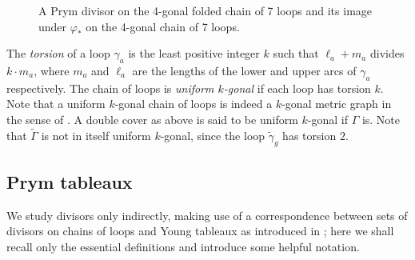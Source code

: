 \documentclass[11pt,reqno]{amsart}
\newcommand*{\N}{\mathbb{N}}
\newcommand*{\maps}{\nobreak\mskip2mu\mathpunct{}\nonscript
  \mkern-\thinmuskip{:}\mskip6muplus1mu\relax}
\newcommand*{\ti}[1]{\tilde{#1}}
\newcommand*{\wti}[1]{\widetilde{#1}}
\newcommand{\caelan}[1]{\textcolor{orange}{\sf C: [#1]}}
\newcommand{\steven}[1]{\textcolor{pink}{\sf S: [#1]}}
\theoremstyle{definition}
\theoremstyle{problem}
\theoremstyle{plain}
\theoremstyle{remark}
\theoremstyle{theorem}
\numberwithin{equation}{section}
\numberwithin{figure}{section}
\begin{document}
\begin{figure}[htb]
  \centering
  
  \caption{A Prym divisor on the 4-gonal folded chain of 7 loops and
    its image under $\varphi_{*}$ on the 4-gonal chain of 7 loops.}
  \label{fig:2}
\end{figure}

The \textit{torsion} of a loop $\gamma_a$ is the least positive
integer $k$ such that $\ell_a+m_a$ divides $k\cdot m_a$, where $m_a$
and $\ell_a$ are the lengths of the lower and upper arcs of $\gamma_a$
respectively.  The chain of loops is \emph{uniform $k$-gonal} if each
loop has torsion $k$. Note that a uniform $k$-gonal chain of loops is
indeed a $k$-gonal metric graph in the sense of \cite[Section
1.3.2]{ABBR152}.  A double cover as above is said to be uniform
$k$-gonal if $\Gamma$ is.  Note that $\wti\Gamma$ is not in itself
uniform $k$-gonal, since the loop $\ti\gamma_g$ has torsion
$2$. %

\subsection{Prym tableaux}
We study divisors only indirectly, making use of a correspondence
between sets of divisors on chains of loops and Young tableaux as
introduced in \cite{Pflueger, len2019skeletons}; here we shall recall
only the essential definitions and introduce some helpful notation.


\end{document}
